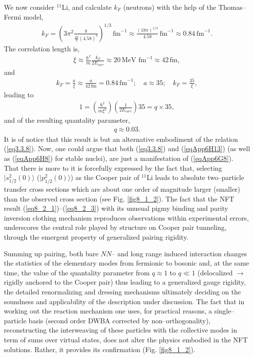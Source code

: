 \begin{subappendices}
We now consider $^{11}$Li, and calculate $k_F$ (neutrons) with the help of the Thomas--Fermi model, 
\begin{align}\label{eqApp6H9}
k_F=\left(3\pi^2\frac{8}{\frac{4\pi}{3}(4.58)^3}\right)^{1/3}\,\text{fm}^{-1}\approx\frac{(18\pi)^{1/3}}{4.58}\,\text{fm}^{-1}\approx 0.84\,\text{fm}^{-1}.
\end{align} 
The correlation length is,
\begin{align}\label{eqApp6H10}
\xi\approx\frac{\hbar^2}{m}\frac{k_F}{2E_{corr}}\approx 20\,\text{MeV fm}^{-1}\approx 42\,\text{fm},
\end{align} 
and
\begin{align}\label{eqApp6H11}
k_F=\frac{a}{\xi}\approx \frac{a}{42\,\text{fm}}=0.84\,\text{fm}^{-1};\quad a\approx 35; \quad k_F=\frac{35}{\xi},
\end{align} 
leading to
\begin{align}\label{eqApp6H12}
1=\left(\frac{\hbar^2}{m\xi^2}\right)\left(\frac{1}{2E_{corr}}\right)35=q\times 35,
\end{align}
and of the resulting quantality parameter,
\begin{align}\label{eqApp6H13}
q\approx 0.03.
\end{align}
It is of notice that this result is but an alternative embodiment of the relation (\ref{eq3.3.8}). Now, one could argue that both (\ref{eq3.3.8}) and (\ref{eqApp6H13}) (as well as (\ref{eqApp6H8}) for stable nuclei), are just a manifestation of (\ref{eqApp6G8}). That there is more to it is forcefully expressed by the fact that, selecting $|s_{1/2}^2(0)\rangle$ ($|p_{1/2}^2(0)\rangle$) as the Cooper pair of $^{11}$Li leads to absolute two--particle transfer cross sections which are about one order of magnitude larger (smaller) than the observed cross section (see Fig. \ref{fig8_1_2}). The fact that the NFT result (\ref{eq8_2_1})--(\ref{eq8_2_3}) with its unusual pigmy binding and parity inversion clothing mechanism reproduces observations within experimental errors, underscores the central role played by structure on Cooper pair tunneling, through the emergent property of generalized pairing rigidity.


Summing up pairing, both bare $NN$-- and long range induced interaction changes the statistics of the elementary modes from fermionic to bosonic and, at the same time, the value of the quantality parameter from $q\approx1$ to $q\ll 1$ (delocalized $\rightarrow$ rigidly anchored to the Cooper pair) thus leading to a generalized gauge rigidity, the detailed renormalizing and dressing mechanisms ultimately deciding on the soundness and applicability of the description under discussion. The fact that in working out the reaction mechanism one uses, for practical reasons, a single--particle basis (second order DWBA corrected by non--orthogonality), reconstructing the interweaving of these particles with the collective modes in term of sums over virtual states, does not alter the physics embodied in the NFT solutions. Rather, it provides its confirmation (Fig. \ref{fig8_1_2}).
 

\end{subappendices}

